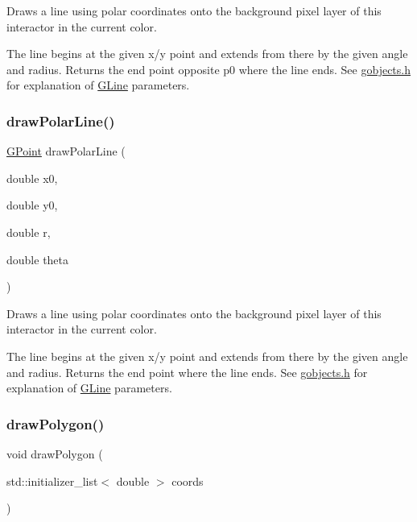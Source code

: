 Draws a line using polar coordinates onto the background pixel layer of this interactor in the current color. 

The line begins at the given x/y point and extends from there by the given angle and radius. Returns the end point opposite p0 where the line ends. See \mbox{\hyperlink{gobjects_8h_source}{gobjects.\+h}} for explanation of \mbox{\hyperlink{classsgl_1_1GLine}{G\+Line}} parameters. \mbox{\label{classsgl_1_1GDrawingSurface_ad3e646f90005295f2bbdf37d2bcb39d2}} 
\subsubsection{\texorpdfstring{draw\+Polar\+Line()}{drawPolarLine()}\hspace{0.1cm}{\footnotesize\ttfamily [2/2]}}
{\footnotesize\ttfamily \mbox{\hyperlink{structsgl_1_1GPoint}{G\+Point}} draw\+Polar\+Line (\begin{DoxyParamCaption}\item[{double}]{x0,  }\item[{double}]{y0,  }\item[{double}]{r,  }\item[{double}]{theta }\end{DoxyParamCaption})\hspace{0.3cm}{\ttfamily [virtual]}}



Draws a line using polar coordinates onto the background pixel layer of this interactor in the current color. 

The line begins at the given x/y point and extends from there by the given angle and radius. Returns the end point where the line ends. See \mbox{\hyperlink{gobjects_8h_source}{gobjects.\+h}} for explanation of \mbox{\hyperlink{classsgl_1_1GLine}{G\+Line}} parameters. \mbox{\label{classsgl_1_1GDrawingSurface_afddec0a905108d8a8d6809a157f26776}} 
\subsubsection{\texorpdfstring{draw\+Polygon()}{drawPolygon()}\hspace{0.1cm}{\footnotesize\ttfamily [1/2]}}
{\footnotesize\ttfamily void draw\+Polygon (\begin{DoxyParamCaption}\item[{std\+::initializer\+\_\+list$<$ double $>$}]{coords }\end{DoxyParamCaption})\hspace{0.3cm}{\ttfamily [virtual]}}



